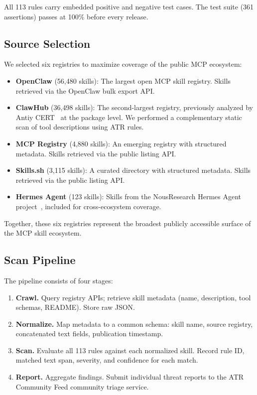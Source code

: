 \documentclass[letterpaper,twocolumn,10pt]{article}
\begin{document}
All 113 rules carry embedded positive and negative test cases.  The test
suite (361 assertions) passes at 100\% before every release.

\subsection{Source Selection}

We selected six registries to maximize coverage of the public MCP
ecosystem:

\begin{itemize}[leftmargin=*,nosep]
  \item \textbf{OpenClaw} (56,480 skills): The largest open MCP skill
    registry.  Skills retrieved via the OpenClaw bulk export API.
  \item \textbf{ClawHub} (36,498 skills): The second-largest registry,
    previously analyzed by Antiy CERT~\cite{antiy2026} at the package
    level.  We performed a complementary static scan of tool
    descriptions using ATR rules.
  \item \textbf{MCP Registry} (4,880 skills): An emerging registry with
    structured metadata.  Skills retrieved via the public listing API.
  \item \textbf{Skills.sh} (3,115 skills): A curated directory with
    structured metadata.  Skills retrieved via the public listing API.
  \item \textbf{Hermes Agent} (123 skills): Skills from the NousResearch
    Hermes Agent project~\cite{hermes}, included for cross-ecosystem
    coverage.
\end{itemize}

Together, these six registries represent the broadest publicly accessible
surface of the MCP skill ecosystem.

\subsection{Scan Pipeline}

The pipeline consists of four stages:

\begin{enumerate}[leftmargin=*,nosep]
  \item \textbf{Crawl.}  Query registry APIs; retrieve skill metadata
    (name, description, tool schemas, README).  Store raw JSON.
  \item \textbf{Normalize.}  Map metadata to a common schema: skill
    name, source registry, concatenated text fields, publication
    timestamp.
  \item \textbf{Scan.}  Evaluate all 113 rules against each normalized
    skill.  Record rule ID, matched text span, severity, and confidence
    for each match.
  \item \textbf{Report.}  Aggregate findings.  Submit individual threat
    reports to the ATR Community Feed community triage service.
\end{enumerate}
\end{document}
